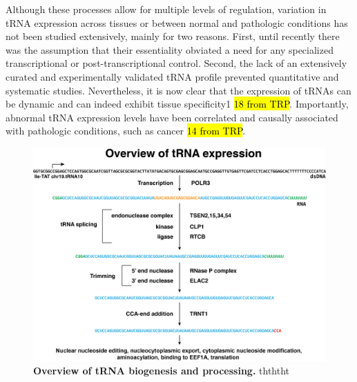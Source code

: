 \documentclass[12pt]{rockefeller}
\begin{document}
Although these processes allow for multiple levels of regulation, variation in tRNA expression across tissues or between normal and pathologic conditions has not been studied extensively, mainly for two reasons. First, until recently there was the assumption that their essentiality obviated a need for any specialized transcriptional or post-transcriptional control. Second, the lack of an extensively curated and experimentally validated tRNA profile prevented quantitative and systematic studies. Nevertheless, it is now clear that the expression of tRNAs can be dynamic and can indeed exhibit tissue specificity1 \hl{18 from TRP}. Importantly, abnormal tRNA expression levels have been correlated and causally associated with pathologic conditions, such as cancer \hl{14 from TRP}.
\newline

\begin{figure}[!ht]%
\centering
\includegraphics[width=\textwidth]{biogenesis2.png}%
\caption[tRNA biogensis]{\textbf{Overview of tRNA biogenesis and processing.} thththt}
\label{biogenesis}%
\end{figure}
\end{document}
